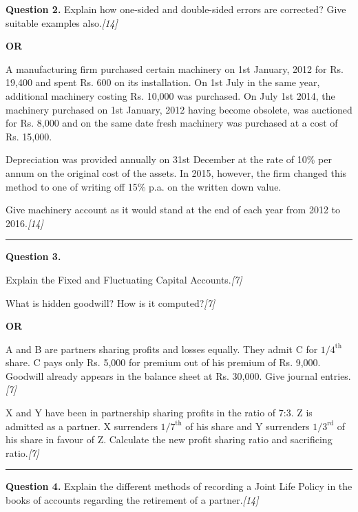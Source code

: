 \documentclass[11pt,a4paper]{article}
\newcommand{\pts}[1]{\hfill   \textit{[#1]}}
\begin{document}
\noindent   \textbf{Question 2.}
Explain how one-sided and double-sided errors are corrected? Give suitable examples also.\pts{14}

\centerline{   \textbf{OR}}

A manufacturing firm purchased certain machinery on 1st January, 2012 for Rs. 19,400 and spent Rs. 600 on its installation. On 1st July in the same year, additional machinery costing Rs. 10,000 was purchased. On July 1st 2014, the machinery purchased on 1st January, 2012 having become obsolete, was auctioned for Rs. 8,000 and on the same date fresh machinery was purchased at a cost of Rs. 15,000.

Depreciation was provided annually on 31st December at the rate of 10\% per annum on the original cost of the assets. In 2015, however, the firm changed this method to one of writing off 15\% p.a. on the written down value.

Give machinery account as it would stand at the end of each year from 2012 to 2016.\pts{14}

\medskip\rule{\linewidth}{0.2pt}




\noindent   \textbf{Question 3.}

\begin{parts}
  \item Explain the Fixed and Fluctuating Capital Accounts.\pts{7}
  \item What is hidden goodwill? How is it computed?\pts{7}
\end{parts}

\centerline{   \textbf{OR}}


\begin{parts}
  \item A and B are partners sharing profits and losses equally. They admit C for $1/4^{ \text{th}}$ share. C pays only Rs. 5,000 for premium out of his premium of Rs. 9,000. Goodwill already appears in the balance sheet at Rs. 30,000. Give journal entries.\pts{7}
  \item X and Y have been in partnership sharing profits in the ratio of 7:3. Z is admitted as a partner. X surrenders $1/7^{ \text{th}}$ of his share and Y surrenders $1/3^{ \text{rd}}$ of his share in favour of Z. Calculate the new profit sharing ratio and sacrificing ratio.\pts{7}
\end{parts}

\medskip\rule{\linewidth}{0.2pt}




\noindent   \textbf{Question 4.}
Explain the different methods of recording a Joint Life Policy in the books of accounts regarding the retirement of a partner.\pts{14}
\end{document}
